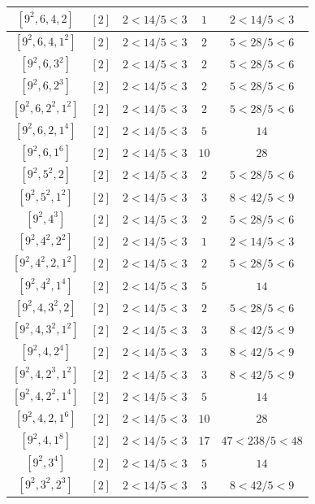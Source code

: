 \documentclass{article}%
\begin{document}
\begin{center}
\begin{longtable}{||c|c|c|c|c||}
$[9^{2}, 6, 4, 2]$ & $[2]$ & $2 < 14/5 < 3$ & $1$ & $2 < 14/5 < 3$ \\ \hline 
$[9^{2}, 6, 4, 1^{2}]$ & $[2]$ & $2 < 14/5 < 3$ & $2$ & $5 < 28/5 < 6$ \\ \hline 
$[9^{2}, 6, 3^{2}]$ & $[2]$ & $2 < 14/5 < 3$ & $2$ & $5 < 28/5 < 6$ \\ \hline 
$[9^{2}, 6, 2^{3}]$ & $[2]$ & $2 < 14/5 < 3$ & $2$ & $5 < 28/5 < 6$ \\ \hline 
$[9^{2}, 6, 2^{2}, 1^{2}]$ & $[2]$ & $2 < 14/5 < 3$ & $2$ & $5 < 28/5 < 6$ \\ \hline 
$[9^{2}, 6, 2, 1^{4}]$ & $[2]$ & $2 < 14/5 < 3$ & $5$ & $14$ \\ \hline 
$[9^{2}, 6, 1^{6}]$ & $[2]$ & $2 < 14/5 < 3$ & $10$ & $28$ \\ \hline 
$[9^{2}, 5^{2}, 2]$ & $[2]$ & $2 < 14/5 < 3$ & $2$ & $5 < 28/5 < 6$ \\ \hline 
$[9^{2}, 5^{2}, 1^{2}]$ & $[2]$ & $2 < 14/5 < 3$ & $3$ & $8 < 42/5 < 9$ \\ \hline 
$[9^{2}, 4^{3}]$ & $[2]$ & $2 < 14/5 < 3$ & $2$ & $5 < 28/5 < 6$ \\ \hline 
$[9^{2}, 4^{2}, 2^{2}]$ & $[2]$ & $2 < 14/5 < 3$ & $1$ & $2 < 14/5 < 3$ \\ \hline 
$[9^{2}, 4^{2}, 2, 1^{2}]$ & $[2]$ & $2 < 14/5 < 3$ & $2$ & $5 < 28/5 < 6$ \\ \hline 
$[9^{2}, 4^{2}, 1^{4}]$ & $[2]$ & $2 < 14/5 < 3$ & $5$ & $14$ \\ \hline 
$[9^{2}, 4, 3^{2}, 2]$ & $[2]$ & $2 < 14/5 < 3$ & $2$ & $5 < 28/5 < 6$ \\ \hline 
$[9^{2}, 4, 3^{2}, 1^{2}]$ & $[2]$ & $2 < 14/5 < 3$ & $3$ & $8 < 42/5 < 9$ \\ \hline 
$[9^{2}, 4, 2^{4}]$ & $[2]$ & $2 < 14/5 < 3$ & $3$ & $8 < 42/5 < 9$ \\ \hline 
$[9^{2}, 4, 2^{3}, 1^{2}]$ & $[2]$ & $2 < 14/5 < 3$ & $3$ & $8 < 42/5 < 9$ \\ \hline 
$[9^{2}, 4, 2^{2}, 1^{4}]$ & $[2]$ & $2 < 14/5 < 3$ & $5$ & $14$ \\ \hline 
$[9^{2}, 4, 2, 1^{6}]$ & $[2]$ & $2 < 14/5 < 3$ & $10$ & $28$ \\ \hline 
$[9^{2}, 4, 1^{8}]$ & $[2]$ & $2 < 14/5 < 3$ & $17$ & $47 < 238/5 < 48$ \\ \hline 
$[9^{2}, 3^{4}]$ & $[2]$ & $2 < 14/5 < 3$ & $5$ & $14$ \\ \hline 
$[9^{2}, 3^{2}, 2^{3}]$ & $[2]$ & $2 < 14/5 < 3$ & $3$ & $8 < 42/5 < 9$ \\ \hline 

\end{longtable}
\end{center}
\end{document}
